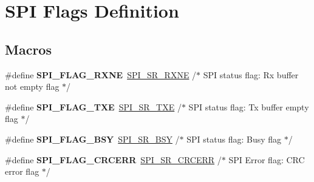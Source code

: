 \hypertarget{group___s_p_i___flags__definition}{}\section{S\+PI Flags Definition}
\label{group___s_p_i___flags__definition}
\subsection*{Macros}
\begin{DoxyCompactItemize}
\item 
\mbox{\label{group___s_p_i___flags__definition_ga7bd627ae57160a2f0aad1736194b5999}} 
\#define {\bfseries S\+P\+I\+\_\+\+F\+L\+A\+G\+\_\+\+R\+X\+NE}~\mbox{\hyperlink{group___peripheral___registers___bits___definition_ga40e14de547aa06864abcd4b0422d8b48}{S\+P\+I\+\_\+\+S\+R\+\_\+\+R\+X\+NE}}   /$\ast$ S\+PI status flag\+: Rx buffer not empty flag       $\ast$/
\item 
\mbox{\label{group___s_p_i___flags__definition_gaf84a1e6af2739a6be58e1b23d9e6b914}} 
\#define {\bfseries S\+P\+I\+\_\+\+F\+L\+A\+G\+\_\+\+T\+XE}~\mbox{\hyperlink{group___peripheral___registers___bits___definition_ga5bd5d21816947fcb25ccae7d3bf8eb2c}{S\+P\+I\+\_\+\+S\+R\+\_\+\+T\+XE}}    /$\ast$ S\+PI status flag\+: Tx buffer empty flag           $\ast$/
\item 
\mbox{\label{group___s_p_i___flags__definition_gaf19c77ee876a3598d616ac07d136fc46}} 
\#define {\bfseries S\+P\+I\+\_\+\+F\+L\+A\+G\+\_\+\+B\+SY}~\mbox{\hyperlink{group___peripheral___registers___bits___definition_gaa3498df67729ae048dc5f315ef7c16bf}{S\+P\+I\+\_\+\+S\+R\+\_\+\+B\+SY}}    /$\ast$ S\+PI status flag\+: Busy flag                      $\ast$/
\item 
\mbox{\label{group___s_p_i___flags__definition_ga30fb6af50e1f3c61cb9de76b0101c889}} 
\#define {\bfseries S\+P\+I\+\_\+\+F\+L\+A\+G\+\_\+\+C\+R\+C\+E\+RR}~\mbox{\hyperlink{group___peripheral___registers___bits___definition_ga69e543fa9584fd636032a3ee735f750b}{S\+P\+I\+\_\+\+S\+R\+\_\+\+C\+R\+C\+E\+RR}} /$\ast$ S\+PI Error flag\+: C\+RC error flag                  $\ast$/
\item 
\mbox{\label{group___s_p_i___flags__definition_gac7d3525ab98cc18f02270a4dba685897}} 

\end{DoxyCompactItemize}
